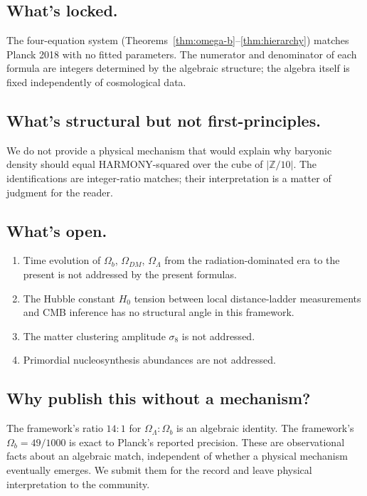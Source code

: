 \documentclass[11pt,reqno]{amsart}
\theoremstyle{plain}
\theoremstyle{definition}
\theoremstyle{remark}
\newcommand{\Z}{\mathbb{Z}}
\begin{document}
\subsection{What's locked.}
The four-equation system (Theorems~\ref{thm:omega-b}--\ref{thm:hierarchy})
matches Planck 2018 with no fitted parameters. The numerator and denominator
of each formula are integers determined by the algebraic structure; the
algebra itself is fixed independently of cosmological data.

\subsection{What's structural but not first-principles.}
We do not provide a physical mechanism that would explain why baryonic
density should equal HARMONY-squared over the cube of $|\Z/10|$. The
identifications are integer-ratio matches; their interpretation is a
matter of judgment for the reader.

\subsection{What's open.}
\begin{enumerate}
\item Time evolution of $\Omega_b$, $\Omega_{DM}$, $\Omega_\Lambda$ from
the radiation-dominated era to the present is not addressed by the
present formulas.
\item The Hubble constant $H_0$ tension between local distance-ladder
measurements and CMB inference has no structural angle in this
framework.
\item The matter clustering amplitude $\sigma_8$ is not addressed.
\item Primordial nucleosynthesis abundances are not addressed.
\end{enumerate}

\subsection{Why publish this without a mechanism?}
The framework's ratio $14:1$ for $\Omega_\Lambda : \Omega_b$ is an
algebraic identity. The framework's $\Omega_b = 49/1000$ is exact to
Planck's reported precision. These are observational facts about an
algebraic match, independent of whether a physical mechanism eventually
emerges. We submit them for the record and leave physical interpretation
to the community.

\end{document}
